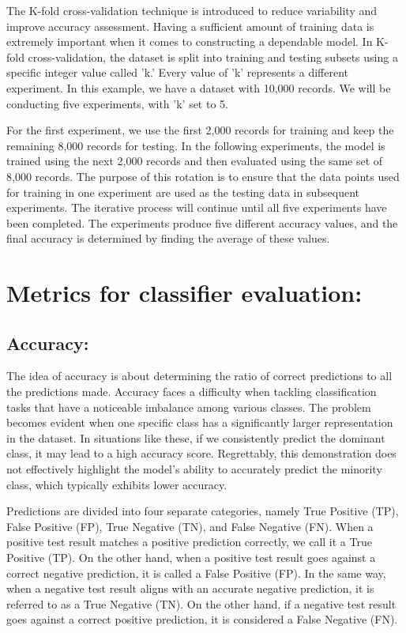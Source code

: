 The K-fold cross-validation technique is introduced to reduce variability and improve accuracy assessment. Having a sufficient amount of training data is extremely important when it comes to constructing a dependable model. In K-fold cross-validation\cite{yadav2016analysis}, the dataset is split into training and testing subsets using a specific integer value called 'k.' Every value of 'k' represents a different experiment. In this example, we have a dataset with 10,000 records. We will be conducting five experiments, with 'k' set to 5.

For the first experiment, we use the first 2,000 records for training and keep the remaining 8,000 records for testing. In the following experiments, the model is trained using the next 2,000 records and then evaluated using the same set of 8,000 records. The purpose of this rotation is to ensure that the data points used for training in one experiment are used as the testing data in subsequent experiments. The iterative process will continue until all five experiments have been completed. The experiments produce five different accuracy values, and the final accuracy is determined by finding the average of these values.



\newpage
\section{Metrics for classifier evaluation:}
\subsection{Accuracy:}


The idea of accuracy is about determining the ratio of correct predictions to all the predictions made. Accuracy faces a difficulty when tackling classification tasks that have a noticeable imbalance among various classes. The problem becomes evident when one specific class has a significantly larger representation in the dataset. In situations like these, if we consistently predict the dominant class, it may lead to a high accuracy score. Regrettably, this demonstration does not effectively highlight the model's ability to accurately predict the minority class, which typically exhibits lower accuracy\cite{javaid2016deep}\cite{yacouby-axman-2020-probabilistic}.



Predictions are divided into four separate categories, namely True Positive (TP), False Positive (FP), True Negative (TN), and False Negative (FN). When a positive test result matches a positive prediction correctly, we call it a True Positive (TP). On the other hand, when a positive test result goes against a correct negative prediction, it is called a False Positive (FP). In the same way, when a negative test result aligns with an accurate negative prediction, it is referred to as a True Negative (TN). On the other hand, if a negative test result goes against a correct positive prediction, it is considered a False Negative (FN).

